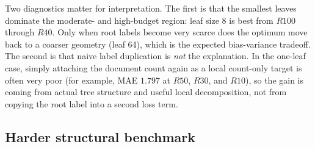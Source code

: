 \documentclass[11pt]{article}
\begin{document}
\begin{table}[t]
    \centering
    \small
    \caption{Recoverable benchmark summary. ``Best root'' is the best root-only tree at that budget; ``best leaf-mass'' is the best tree after reallocating the missing root supervision mass to count-only leaf labels.}
    \label{tab:recoverable-markov}
\end{table}

Two diagnostics matter for interpretation. The first is that the smallest leaves dominate the moderate- and high-budget region: leaf size 8 is best from $R100$ through $R40$. Only when root labels become very scarce does the optimum move back to a coarser geometry (leaf 64), which is the expected bias-variance tradeoff. The second is that naive label duplication is \emph{not} the explanation. In the one-leaf case, simply attaching the document count again as a local count-only target is often very poor (for example, MAE $1.797$ at $R50$, $R30$, and $R10$), so the gain is coming from actual tree structure and useful local decomposition, not from copying the root label into a second loss term.

\subsection{Harder structural benchmark}
\end{document}
